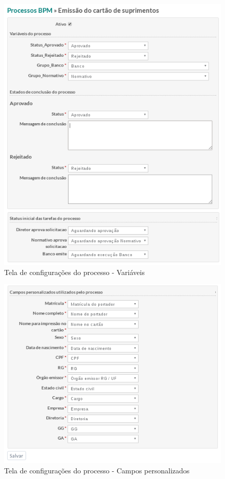 \begin{figure}[H]
\centering
\includegraphics[width=1\textwidth]{imagens/plugin_process_settings1.png}
\caption{Tela de configurações do processo - Variáveis}
\label{fig:plugin_process_settings}
\end{figure}

\begin{figure}[H]
\centering
\includegraphics[width=1\textwidth]{imagens/plugin_process_settings2.png}
\caption{Tela de configurações do processo - Campos personalizados}
\label{fig:plugin_process_settings}
\end{figure}

